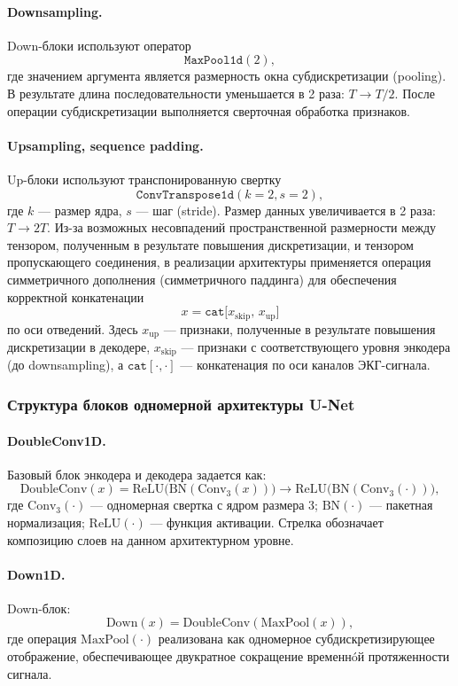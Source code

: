 \documentclass[10pt,a4paper]{book}
\begin{document}
\paragraph{Downsampling.}
Down-блоки используют оператор
\[
\texttt{MaxPool1d}(2),
\]
где значением аргумента является размерность окна субдискретизации (pooling). В результате длина последовательности уменьшается в 2 раза: $T \rightarrow T/2$. После операции субдискретизации выполняется сверточная обработка признаков.

\paragraph{Upsampling, sequence padding.}
Up-блоки используют транспонированную свертку
\[
\texttt{ConvTranspose1d}(k{=}2, s{=}2),
\]
где $k$ --- размер ядра, $s$ --- шаг (stride). Размер данных увеличивается в 2 раза: $T \rightarrow 2T$. Из-за возможных несовпадений пространственной размерности между тензором, полученным в результате повышения дискретизации, и тензором пропускающего соединения, в реализации архитектуры применяется операция симметричного дополнения (симметричного паддинга) для обеспечения корректной конкатенации
\[
x = \texttt{cat}\big[x_{\text{skip}},\, x_{\text{up}}\big]
\]
по оси отведений. Здесь $x_{\text{up}}$ --- признаки, полученные в результате повышения дискретизации в декодере, $x_{\text{skip}}$ --- признаки с соответствующего уровня энкодера (до downsampling), а $\texttt{cat}[\cdot,\cdot]$ --- конкатенация по оси каналов ЭКГ-сигнала.

\subsubsection{Структура блоков одномерной архитектуры U-Net}

\paragraph{DoubleConv1D.}
Базовый блок энкодера и декодера задается как:
\[
\text{DoubleConv}(x)=
\text{ReLU}\big(\text{BN}(\text{Conv}_{3}(x))\big)
\rightarrow
\text{ReLU}\big(\text{BN}(\text{Conv}_{3}(\cdot))\big),
\]
где $\text{Conv}_{3}(\cdot)$ --- одномерная свертка с ядром размера 3; $\text{BN}(\cdot)$ --- пакетная нормализация; $\text{ReLU}(\cdot)$ --- функция активации. Стрелка обозначает композицию слоев на данном архитектурном уровне.

\paragraph{Down1D.}
Down-блок:
\[
\text{Down}(x) = \text{DoubleConv}(\text{MaxPool}(x)),
\]
где операция $\text{MaxPool}(\cdot)$ реализована как одномерное субдискретизирующее отображение, обеспечивающее двукратное сокращение временнóй протяженности сигнала.
\end{document}
